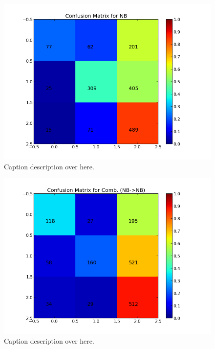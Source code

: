 \begin{minipage}[c]{\linewidth}
     \begin{minipage}{0.45\linewidth}
          \begin{figure}[H]
               \includegraphics[width=\linewidth]{../img/plots/grid/confusion_matrix_NB.png}
           \caption[Results overview across models]{Caption description over here.}
           \label{fig:confmat_nb}
          \end{figure}
     \end{minipage}
     \hspace{0.05\linewidth}
     \begin{minipage}{0.45\linewidth}
          \begin{figure}[H]
               \includegraphics[width=\linewidth]{../img/plots/grid/confusion_matrix_Comb-NB-NB.png}
           \caption[Results overview across models]{Caption description over here.}
           \label{fig:confmat_nb_nb}
          \end{figure}
     \end{minipage}   \\
         


\end{minipage}
